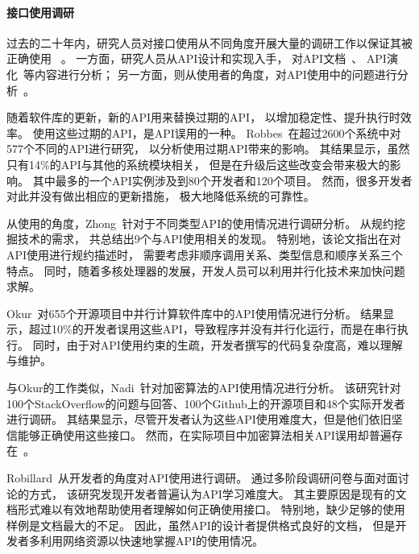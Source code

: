 \paragraph{接口使用调研}
过去的二十年内，研究人员对接口使用从不同角度开展大量的调研工作以保证其被正确使用
~\cite{16-icse-cry,17-tse-survey, 12-fse-parallel,12-fse-deprecation,	18-sqj-evolution,11-etaps-doc, 15-ese-evolution, 11-ese-learning, 15-tse-change,13-etaps-mapping}。
一方面，研究人员从API设计和实现入手，
对API文档~\cite{12-fse-deprecation, 18-sqj-evolution,11-etaps-doc}、
API演化~\cite{15-ese-evolution,15-tse-change}等内容进行分析；
另一方面，则从使用者的角度，对API使用中的问题进行分析~\cite{16-icse-cry,17-tse-survey,12-fse-parallel,11-ese-learning,13-etaps-mapping}。

随着软件库的更新，新的API用来替换过期的API，
以增加稳定性、提升执行时效率。
使用这些过期的API，是API误用的一种。
Robbes~\cite{12-fse-deprecation, 18-sqj-evolution}在超过2600个系统中对577个不同的API进行研究，
以分析使用过期API带来的影响。
其结果显示，虽然只有14\%的API与其他的系统模块相关，
但是在升级后这些改变会带来极大的影响。
其中最多的一个API实例涉及到80个开发者和120个项目。
然而，很多开发者对此并没有做出相应的更新措施，
极大地降低系统的可靠性。

从使用的角度，Zhong~\cite{17-tse-survey}针对于不同类型API的使用情况进行调研分析。
从规约挖掘技术的需求，
共总结出9个与API使用相关的发现。
特别地，该论文指出在对API使用进行规约描述时，
需要考虑非顺序调用关系、类型信息和顺序关系三个特点。
同时，随着多核处理器的发展，开发人员可以利用并行化技术来加快问题求解。

Okur~\cite{12-fse-parallel}对655个开源项目中并行计算软件库中的API使用情况进行分析。
结果显示，超过10\%的开发者误用这些API，导致程序并没有并行化运行，而是在串行执行。
同时，由于对API使用约束的生疏，开发者撰写的代码复杂度高，难以理解与维护。

与Okur的工作类似，Nadi~\cite{16-icse-cry}针对加密算法的API使用情况进行分析。
该研究针对100个StackOverflow的问题与回答、100个Github上的开源项目和48个实际开发者进行调研。
其结果显示，尽管开发者认为这些API使用难度大，但是他们依旧坚信能够正确使用这些接口。
然而，在实际项目中加密算法相关API误用却普遍存在~\cite{13-ccs-misuse}。

Robillard~\cite{11-ese-learning}从开发者的角度对API使用进行调研。
通过多阶段调研问卷与面对面讨论的方式，
该研究发现开发者普遍认为API学习难度大。
其主要原因是现有的文档形式难以有效地帮助使用者理解如何正确使用接口。
特别地，缺少足够的使用样例是文档最大的不足。
因此，虽然API的设计者提供格式良好的文档，
但是开发者多利用网络资源以快速地掌握API的使用情况。

